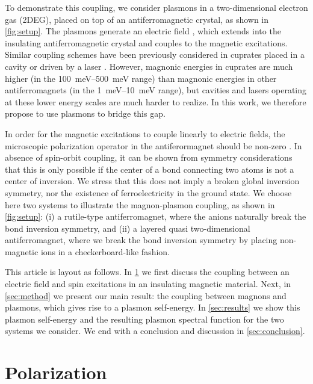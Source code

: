\documentclass[aps,prb,reprint,twocolumns,superscriptaddress,nofootinbib]{revtex4-2}
\begin{document}
	To demonstrate this coupling, we consider plasmons in a two-dimensional electron gas (2DEG), placed on top of an antiferromagnetic crystal, as shown in \cref{fig:setup}. The plasmons generate an electric field \cite{ferreiraQuantizationGraphenePlasmons2020}, which extends into the insulating antiferromagnetic crystal and couples to the magnetic excitations. 
	Similar coupling schemes have been previously considered in cuprates placed in a cavity \cite{curtisCavityMagnonpolaritonsCuprate2022} or driven by a laser \cite{bossiniLaserdrivenQuantumMagnonics2019,bossiniUltrafastAmplificationNonlinear2021,shanDynamicMagneticPhase2024}. However, magnonic energies in cuprates are much higher (in the \SIrange{100}{500}{meV} range) than magnonic energies in other antiferromagnets (in the \SIrange{1}{10}{meV} range), but cavities and lasers operating at these lower energy scales are much harder to realize. In this work, we therefore propose to use plasmons to bridge this gap.
	
	
	In order for the magnetic excitations to couple linearly to electric fields, the microscopic polarization operator in the antiferormagnet should be non-zero \cite{sergienkoFerroelectricityMagneticEPhase2006,bolensTheoryElectronicMagnetoelectric2018}. In absence of spin-orbit coupling, it can be shown from symmetry considerations that this is only possible if the center of a bond connecting two atoms is not a center of inversion. We stress that this does not imply a broken global inversion symmetry, nor the existence of ferroelectricity in the ground state. We choose here two systems to illustrate the magnon-plasmon coupling, as shown in \cref{fig:setup}: (i) a rutile-type antiferromagnet, where the anions naturally break the bond inversion symmetry, and (ii) a layered quasi two-dimensional antiferromagnet, where we break the bond inversion symmetry by placing non-magnetic ions in a checkerboard-like fashion.
	

	
	
	This article is layout as follows. In \cref{sec:polarization} we first discuss the coupling between an electric field and spin excitations in an insulating magnetic material. Next, in \cref{sec:method} we present our main result: the coupling between magnons and plasmons, which gives rise to a plasmon self-energy. In \cref{sec:results} we show this plasmon self-energy and the resulting plasmon spectral function for the two systems we consider. We end with a conclusion and discussion in \cref{sec:conclusion}.
	
	
	\section{Polarization}
	\label{sec:polarization}
	
\end{document}
